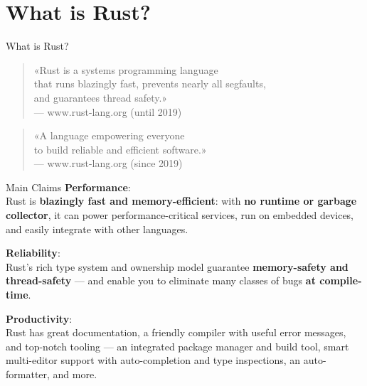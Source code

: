 \section{What is Rust?}


\begin{frame}[c]{What is Rust?}
	\begin{quote}
		«Rust is a systems programming language\\
		that runs blazingly fast, prevents nearly all segfaults,\\
		and guarantees thread safety.»\\
		\vspace{0.5em}
		{\normalfont \small --- www.rust-lang.org (until 2019)}
	\end{quote}

	\vspace{2em}

	\begin{quote}
		«A language empowering everyone\\
		to build reliable and efficient software.»\\
		\vspace{0.5em}
		{\normalfont \small --- www.rust-lang.org (since 2019)}
	\end{quote}
\end{frame}


\begin{frame}{Main Claims}
	\textbf{Performance}:\\Rust is \textbf{blazingly fast and memory-efficient}:
	with \textbf{no runtime or garbage collector}, it can power
	performance-critical services, run on embedded devices, and easily integrate
	with other languages.

	\pause

	\textbf{Reliability}:\\Rust's rich type system and ownership model guarantee
	\textbf{memory-safety and thread-safety} — and enable you to eliminate many
	classes of bugs \textbf{at compile-time}.

	\pause

	\textbf{Productivity}:\\Rust has great documentation, a friendly compiler with
	useful error messages, and top-notch tooling — an integrated package manager
	and build tool, smart multi-editor support with auto-completion and type
	inspections, an auto-formatter, and more.
\end{frame}

